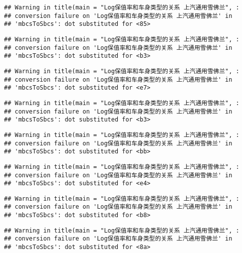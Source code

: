 \documentclass[]{article}
\begin{document}
\begin{verbatim}
## Warning in title(main = "Log保值率和车身类型的关系 上汽通用雪佛兰", :
## conversion failure on 'Log保值率和车身类型的关系 上汽通用雪佛兰' in
## 'mbcsToSbcs': dot substituted for <85>
\end{verbatim}

\begin{verbatim}
## Warning in title(main = "Log保值率和车身类型的关系 上汽通用雪佛兰", :
## conversion failure on 'Log保值率和车身类型的关系 上汽通用雪佛兰' in
## 'mbcsToSbcs': dot substituted for <b3>
\end{verbatim}

\begin{verbatim}
## Warning in title(main = "Log保值率和车身类型的关系 上汽通用雪佛兰", :
## conversion failure on 'Log保值率和车身类型的关系 上汽通用雪佛兰' in
## 'mbcsToSbcs': dot substituted for <e7>
\end{verbatim}

\begin{verbatim}
## Warning in title(main = "Log保值率和车身类型的关系 上汽通用雪佛兰", :
## conversion failure on 'Log保值率和车身类型的关系 上汽通用雪佛兰' in
## 'mbcsToSbcs': dot substituted for <b3>
\end{verbatim}

\begin{verbatim}
## Warning in title(main = "Log保值率和车身类型的关系 上汽通用雪佛兰", :
## conversion failure on 'Log保值率和车身类型的关系 上汽通用雪佛兰' in
## 'mbcsToSbcs': dot substituted for <bb>
\end{verbatim}

\begin{verbatim}
## Warning in title(main = "Log保值率和车身类型的关系 上汽通用雪佛兰", :
## conversion failure on 'Log保值率和车身类型的关系 上汽通用雪佛兰' in
## 'mbcsToSbcs': dot substituted for <e4>
\end{verbatim}

\begin{verbatim}
## Warning in title(main = "Log保值率和车身类型的关系 上汽通用雪佛兰", :
## conversion failure on 'Log保值率和车身类型的关系 上汽通用雪佛兰' in
## 'mbcsToSbcs': dot substituted for <b8>
\end{verbatim}

\begin{verbatim}
## Warning in title(main = "Log保值率和车身类型的关系 上汽通用雪佛兰", :
## conversion failure on 'Log保值率和车身类型的关系 上汽通用雪佛兰' in
## 'mbcsToSbcs': dot substituted for <8a>
\end{verbatim}
\end{document}
